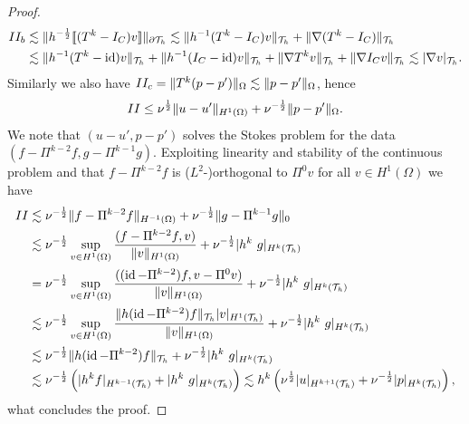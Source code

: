 \documentclass[pdflatex,sn-mathphys,Numbered]{sn-jnl}%
\theoremstyle{remark}%
\theoremstyle{definition}%
\begin{document}
\begin{proof}
\begin{align*}
  II_b & \lesssim \Vert h^{-\frac12} [\![ (T^k - I_C) v]\!] \Vert_{\partial {\mathcal{T}_h}} \lesssim  \Vert  h^{-1}(T^k - I_C) v \Vert_{{\mathcal{T}_h}} + \Vert \nabla (T^k - I_C)  \Vert_{{\mathcal{T}_h}} \\
 &\lesssim  \Vert  h^{-1}(T^k - \operatorname{id}) v \Vert_{{\mathcal{T}_h}} + \Vert h^{-1} (I_C - \operatorname{id}) v \Vert_{{\mathcal{T}_h}}
 + \Vert \nabla T^k v  \Vert_{{\mathcal{T}_h}} + \Vert \nabla I_C v  \Vert_{{\mathcal{T}_h}} \lesssim  \vert  \nabla v \vert_{{\mathcal{T}_h}}.
 \end{align*}
Similarly we also have $II_c  =  \Vert  T^k (p-p') \Vert_{\Omega} \lesssim
 \Vert  p-p' \Vert_{\Omega}$, hence 
 $$II \leq \nu^{\frac12}  \Vert  u-u' \Vert_{H^1(\Omega)} + \nu^{-\frac12}
 \Vert  p-p' \Vert_{\Omega}.$$ We note that $(u-u', p-p')$ solves the Stokes
 problem for the data $(f- \Pi^{k-2}f,g-\Pi^{k-1}g)$. Exploiting
 linearity and stability of the continuous problem and that $f-
 \Pi^{k-2}f$ is ($L^2$-)orthogonal to $\Pi^0 v$ for all $v \in
 H^1(\Omega)$ we have
\begin{align*}
  II & \lesssim \nu^{-\frac12} \Vert f - \Pi^{k-2} f \Vert_{H^{-1}(\Omega)} + \nu^{-\frac12} \Vert g - \Pi^{k-1} g \Vert_{0} \\
  & \lesssim \nu^{-\frac12} \sup_{v \in H^1(\Omega)} \frac{ (f - \Pi^{k-2} f,v)}{\Vert v \Vert_{H^{1}(\Omega)}} + \nu^{-\frac12} \vert h^k \ g \vert_{H^k({\mathcal{T}_h})} \\
  & = \nu^{-\frac12} \sup_{v \in H^1(\Omega)} \frac{ ((\operatorname{id} - \Pi^{k-2}) f,v - \Pi^0 v)}{\Vert v \Vert_{H^{1}(\Omega)}} + \nu^{-\frac12} \vert h^k \ g \vert_{H^k({\mathcal{T}_h})} \\
  & \lesssim \nu^{-\frac12} \sup_{v \in H^1(\Omega)} \frac{\Vert h(\operatorname{id} - \Pi^{k-2}) f \Vert_{{\mathcal{T}_h}} \vert  v \vert_{H^1({\mathcal{T}_h})}}{\Vert v \Vert_{H^{1}(\Omega)}} + \nu^{-\frac12} \vert h^k\ g \vert_{H^k({\mathcal{T}_h})} \\
  &   \lesssim \nu^{-\frac12} \Vert h (\operatorname{id} - \Pi^{k-2}) f \Vert_{{\mathcal{T}_h}} + \nu^{-\frac12} \vert h^k \ g \vert_{H^k({\mathcal{T}_h})}
  \\
  & \lesssim \nu^{-\frac12} \left( \vert h^k f \vert_{H^{k-1}({\mathcal{T}_h})} + \vert h^k \ g \vert_{H^k({\mathcal{T}_h})} \right)
    \lesssim h^k \left( \nu^{\frac12} \vert u \vert_{H^{k+1}({\mathcal{T}_h})} + \nu^{-\frac12}  \vert p \vert_{H^k({\mathcal{T}_h})} \right),
\end{align*}
what concludes the proof.


\end{proof}
\end{document}
